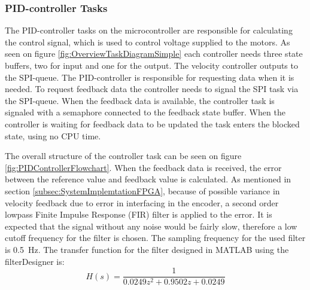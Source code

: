 \documentclass[../../main.tex]{subfiles}
\begin{document}
\subsubsection*{PID-controller Tasks}
The PID-controller tasks on the microcontroller are responsible for calculating the control signal, which is used to control voltage supplied to the motors. As seen on figure \ref{fig:OverviewTaskDiagramSimple} each controller needs three state buffers, two for input and one for the output. The velocity controller outputs to the SPI-queue. The PID-controller is responsible for requesting data when it is needed. To request feedback data the controller needs to signal the SPI task via the SPI-queue. When the feedback data is available, the controller task is signaled with a semaphore connected to the feedback state buffer. When the controller is waiting for feedback data to be updated the task enters the blocked state, using no CPU time. 




The overall structure of the controller task can be seen on figure \ref{fig:PIDControllerFlowchart}. When the feedback data is received, the error between the reference value and feedback value is calculated. As mentioned in section \ref{subsec:SystemImplemtationFPGA}, because of possible variance in velocity feedback due to error in interfacing in the encoder, a second order lowpass Finite Impulse Response (FIR) filter is applied to the error. It is expected that the signal without any noise would be fairly slow, therefore a low cutoff frequency for the filter is chosen. The sampling frequency for the used filter is \SI{0.5}{\hertz}.
The transfer function for the filter designed in MATLAB using the filterDesigner is:
\begin{equation}
    H(s) = \frac{1}{0.0249z^2 + 0.9502z + 0.0249}
\end{equation}
\end{document}
